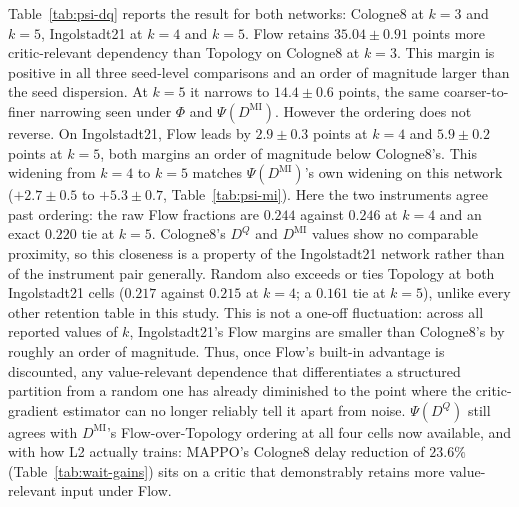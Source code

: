 \documentclass[journal]{IEEEtran}
\theoremstyle{definition}
\begin{document}
Table~\ref{tab:psi-dq} reports the result for both networks: Cologne8 at $k=3$ and $k=5$, Ingolstadt21 at $k=4$ and $k=5$.
Flow retains $35.04\pm0.91$ points more critic-relevant dependency than Topology on Cologne8 at $k=3$. This margin is positive in all three seed-level comparisons and an order of magnitude larger than the seed dispersion. At $k=5$ it narrows to $14.4\pm0.6$ points, the same coarser-to-finer narrowing seen under $\Phi$ and $\Psi(D^{\mathrm{MI}})$. However the ordering does not reverse. On Ingolstadt21, Flow leads by $2.9\pm0.3$ points at $k=4$ and $5.9\pm0.2$ points at $k=5$, both margins an order of magnitude below Cologne8's. This widening from $k=4$ to $k=5$ matches $\Psi(D^{\mathrm{MI}})$'s own widening on this network ($+2.7\pm0.5$ to $+5.3\pm0.7$, Table~\ref{tab:psi-mi}). Here the two instruments agree past ordering: the raw Flow fractions are $0.244$ against $0.246$ at $k=4$ and an exact $0.220$ tie at $k=5$. Cologne8's $D^Q$ and $D^{\mathrm{MI}}$ values show no comparable proximity, so this closeness is a property of the Ingolstadt21 network rather than of the instrument pair generally. Random also exceeds or ties Topology at both Ingolstadt21 cells ($0.217$ against $0.215$ at $k=4$; a $0.161$ tie at $k=5$), unlike every other retention table in this study. This is not a one-off fluctuation: across all reported values of $k$, Ingolstadt21’s Flow margins are smaller than Cologne8’s by roughly an order of magnitude. Thus, once Flow’s built-in advantage is discounted, any value-relevant dependence that differentiates a structured partition from a random one has already diminished to the point where the critic-gradient estimator can no longer reliably tell it apart from noise. $\Psi(D^{Q})$ still agrees with $D^{\mathrm{MI}}$'s Flow-over-Topology ordering at all four cells now available, and with how L2 actually trains: MAPPO's Cologne8 delay reduction of $23.6\%$ (Table~\ref{tab:wait-gains}) sits on a critic that demonstrably retains more value-relevant input under Flow.
\end{document}
